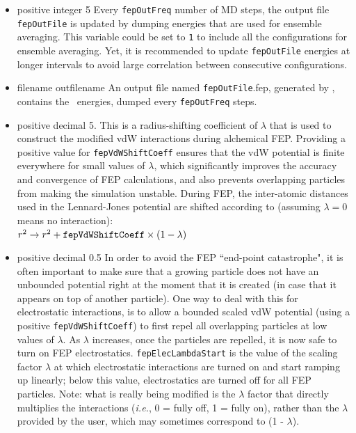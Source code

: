\begin{itemize}
\item
{}
{positive integer}
{5}
{Every {\tt fepOutFreq} number of MD steps, the output file
{\tt fepOutFile} is updated by dumping energies that are
used for ensemble averaging.
This variable could be set to {\tt 1} to include all the 
configurations for ensemble averaging. Yet, it is recommended
to update {\tt fepOutFile}  energies at longer intervals
to avoid large correlation between consecutive configurations.}

\item
{}
{filename}
{outfilename}
{An output file named {\tt fepOutFile}.fep, generated by \NAMD,
contains the \FEP\ energies, dumped every {\tt fepOutFreq} steps.}

\item
{}
{positive decimal}
{5.}
{This is a radius-shifting coefficient of $\lambda$ that is used 
to construct the modified vdW interactions during alchemical FEP. Providing a positive value for {\tt fepVdWShiftCoeff} ensures that the vdW potential is finite everywhere for small values of $\lambda$, which significantly improves the accuracy and convergence of FEP calculations, and also prevents overlapping particles from making the simulation unstable. During FEP, the inter-atomic distances used in the Lennard-Jones potential are shifted
according to (assuming $\lambda = 0$ means no interaction): \\
$r^2 \rightarrow r^2 + {\tt fepVdWShiftCoeff} \times (1 - \lambda)$
}

\item
{}
{positive decimal}
{0.5}
{In order to avoid the FEP ``end-point catastrophe", it is often important to make sure that a growing particle does not have an unbounded potential right at the moment that it is created (in case that it appears on top of another particle). One way to deal with this for electrostatic interactions, is to allow a bounded scaled vdW potential (using a positive {\tt fepVdWShiftCoeff}) to first repel all overlapping particles at low values of $\lambda$. As $\lambda$ increases, once the particles are repelled, it is now safe to turn on FEP electrostatics. {\tt fepElecLambdaStart} is the value of the scaling factor $\lambda$ at which electrostatic interactions are turned on and start ramping up linearly; below this value, electrostatics are turned off for all FEP particles. Note: what is really being modified is the $\lambda$ factor that directly multiplies the interactions (\emph{i.e.}, 0 = fully off, 1 = fully on), rather than the $\lambda$ provided by the user, which may sometimes correspond to (1 - $\lambda$).}



\end{itemize}
